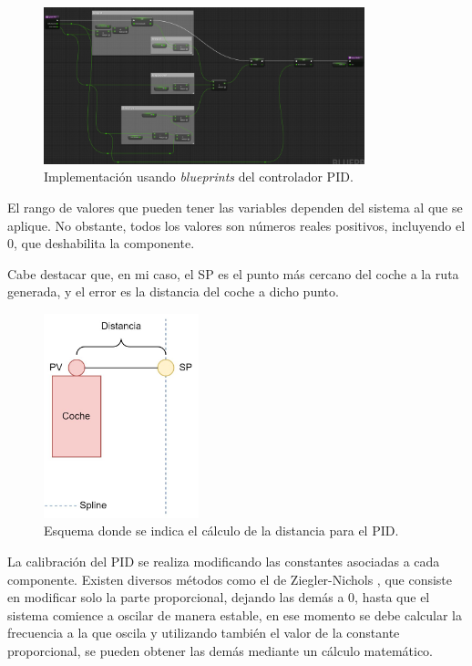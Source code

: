 \bigskip

\begin{figure}[H]
\centering
\includegraphics[width=0.83\textwidth]{imagenes/converted/PID-BP.jpg}
\caption{Implementación usando \textit{blueprints} del controlador PID.}
\label{fig:pidbp}
\end{figure}

El rango de valores que pueden tener las variables dependen del sistema al que se aplique. No obstante, todos los valores son números reales positivos, incluyendo el 0, que deshabilita la componente.

\bigskip

Cabe destacar que, en mi caso, el SP es el punto más cercano del coche a la ruta generada, y el error es la distancia del coche a dicho punto.

\begin{figure}[H]
    \centering
    \includegraphics[width=0.4\textwidth]{imagenes/converted/errorPID.jpg}
    \caption{Esquema donde se indica el cálculo de la distancia para el PID.}
    \label{fig:errorpid}
    \end{figure}

La calibración del PID se realiza modificando las constantes asociadas a cada componente. Existen diversos métodos como el de Ziegler-Nichols \cite{10.1115/1.4019264}, que consiste en modificar solo la parte proporcional, dejando las demás a 0, hasta que el sistema comience a oscilar de manera estable, en ese momento se debe calcular la frecuencia a la que oscila y utilizando también el valor de la constante proporcional, se pueden obtener las demás mediante un cálculo matemático.

